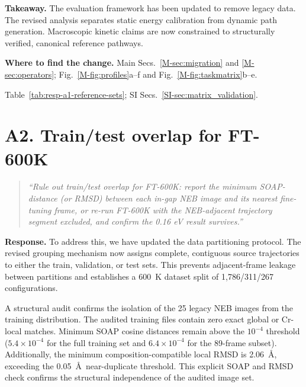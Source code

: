 \documentclass[11pt]{article}
\newcommand{\location}[2]{\par{\small\textbf{Where to find the change.} #1\par #2}\par}
\begin{document}
\textbf{Takeaway.} The evaluation framework has been updated to remove legacy data. The revised analysis separates static energy calibration from dynamic path generation. Macroscopic kinetic claims are now constrained to structurally verified, canonical reference pathways.
\location{Main Secs.~\ref{M-sec:migration} and \ref{M-sec:operators}; Fig.~\ref{M-fig:profiles}a--f and Fig.~\ref{M-fig:taskmatrix}b--e.}{Table~\ref{tab:resp-a1-reference-sets}; SI Secs.~\ref{SI-sec:matrix_validation}.}

\section*{A2. Train/test overlap for FT-600K}

\begin{quote}\small \itshape
``Rule out train/test overlap for FT-600K: report the minimum SOAP-distance (or RMSD) between each in-gap NEB image and its nearest fine-tuning frame, or re-run FT-600K with the NEB-adjacent trajectory segment excluded, and confirm the 0.16 eV result survives.''\end{quote}

\textbf{Response.} 
To address this, we have updated the data partitioning protocol. The revised grouping mechanism now assigns complete, contiguous source trajectories to either the train, validation, or test sets. This prevents adjacent-frame leakage between partitions and establishes a 600~K dataset split of 1,786/311/267 configurations.

A structural audit confirms the isolation of the 25 legacy NEB images from the training distribution. The audited training files contain zero exact global or Cr-local matches. Minimum SOAP cosine distances remain above the $10^{-4}$ threshold ($5.4\times10^{-4}$ for the full training set and $6.4\times10^{-4}$ for the 89-frame subset). Additionally, the minimum composition-compatible local RMSD is 2.06~\AA, exceeding the 0.05~\AA\ near-duplicate threshold. This explicit SOAP and RMSD check confirms the structural independence of the audited image set.
\end{document}
